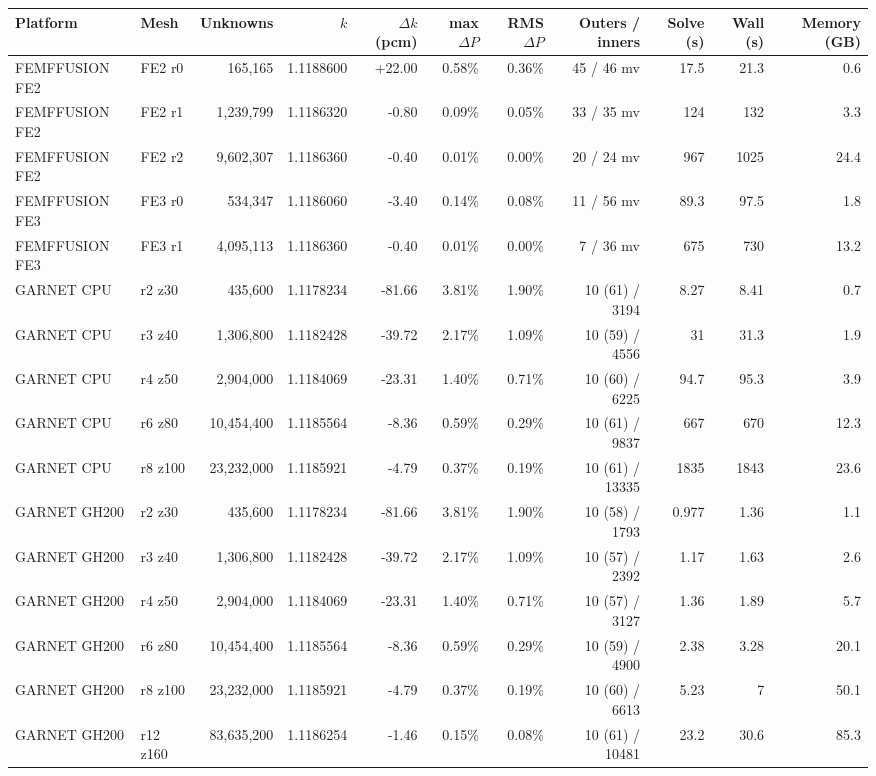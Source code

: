\begin{tabular}{llrrrrrrrrr}
\hline
Platform & Mesh & Unknowns & $k$ & $\Delta k$ (pcm) & max $\Delta P$ & RMS $\Delta P$ & Outers / inners & Solve (s) & Wall (s) & Memory (GB) \\
\hline
FEMFFUSION FE2 & FE2 r0 & 165,165 & 1.1188600 & +22.00 & 0.58\% & 0.36\% & 45 / 46 mv & 17.5 & 21.3 & 0.6 \\
FEMFFUSION FE2 & FE2 r1 & 1,239,799 & 1.1186320 & -0.80 & 0.09\% & 0.05\% & 33 / 35 mv & 124 & 132 & 3.3 \\
FEMFFUSION FE2 & FE2 r2 & 9,602,307 & 1.1186360 & -0.40 & 0.01\% & 0.00\% & 20 / 24 mv & 967 & 1025 & 24.4 \\
FEMFFUSION FE3 & FE3 r0 & 534,347 & 1.1186060 & -3.40 & 0.14\% & 0.08\% & 11 / 56 mv & 89.3 & 97.5 & 1.8 \\
FEMFFUSION FE3 & FE3 r1 & 4,095,113 & 1.1186360 & -0.40 & 0.01\% & 0.00\% & 7 / 36 mv & 675 & 730 & 13.2 \\
GARNET CPU & r2 z30 & 435,600 & 1.1178234 & -81.66 & 3.81\% & 1.90\% & 10 (61) / 3194 & 8.27 & 8.41 & 0.7 \\
GARNET CPU & r3 z40 & 1,306,800 & 1.1182428 & -39.72 & 2.17\% & 1.09\% & 10 (59) / 4556 & 31 & 31.3 & 1.9 \\
GARNET CPU & r4 z50 & 2,904,000 & 1.1184069 & -23.31 & 1.40\% & 0.71\% & 10 (60) / 6225 & 94.7 & 95.3 & 3.9 \\
GARNET CPU & r6 z80 & 10,454,400 & 1.1185564 & -8.36 & 0.59\% & 0.29\% & 10 (61) / 9837 & 667 & 670 & 12.3 \\
GARNET CPU & r8 z100 & 23,232,000 & 1.1185921 & -4.79 & 0.37\% & 0.19\% & 10 (61) / 13335 & 1835 & 1843 & 23.6 \\
GARNET GH200 & r2 z30 & 435,600 & 1.1178234 & -81.66 & 3.81\% & 1.90\% & 10 (58) / 1793 & 0.977 & 1.36 & 1.1 \\
GARNET GH200 & r3 z40 & 1,306,800 & 1.1182428 & -39.72 & 2.17\% & 1.09\% & 10 (57) / 2392 & 1.17 & 1.63 & 2.6 \\
GARNET GH200 & r4 z50 & 2,904,000 & 1.1184069 & -23.31 & 1.40\% & 0.71\% & 10 (57) / 3127 & 1.36 & 1.89 & 5.7 \\
GARNET GH200 & r6 z80 & 10,454,400 & 1.1185564 & -8.36 & 0.59\% & 0.29\% & 10 (59) / 4900 & 2.38 & 3.28 & 20.1 \\
GARNET GH200 & r8 z100 & 23,232,000 & 1.1185921 & -4.79 & 0.37\% & 0.19\% & 10 (60) / 6613 & 5.23 & 7 & 50.1 \\
GARNET GH200 & r12 z160 & 83,635,200 & 1.1186254 & -1.46 & 0.15\% & 0.08\% & 10 (61) / 10481 & 23.2 & 30.6 & 85.3 \\
\hline
\end{tabular}
